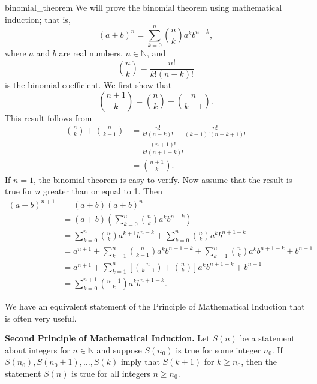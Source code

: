\begin{example}{binomial_theorem}
We will prove the binomial theorem using mathematical induction; that is, 
\[
(a + b)^n = \sum_{k = 0}^{n} \binom{n}{k} a^k b^{n - k},
\]
where $a$ and $b$ are real numbers, $n \in \mathbb{N}$, and
\[
\binom{n}{k}
= \frac{n!}{k! (n - k)!}\label{factorial}
\]
is the binomial coefficient.\label{binomial}  We first show that
\[
\binom{n + 1}{k}
=
\binom{n}{k} + \binom{n}{k - 1}.
\]
This result follows from
\begin{align*}
\binom{n}{k} + \binom{n}{k - 1}
& =
\frac{n!}{k!(n - k)!}
+\frac{n!}{(k-1)!(n - k + 1)!} \\
& =
\frac{(n + 1)!}{k!(n + 1 - k)!} \\
& =
\binom{n + 1}{k}.
\end{align*}
If $n = 1$, the binomial theorem is easy to verify. Now assume that the result is true for $n$ greater than or equal to 1.  Then
\begin{align*}
(a + b)^{n + 1}
& = 
(a + b)(a + b)^n \\
& =
(a + b) 
\left(
\sum_{k = 0}^{n} \binom{n}{k} a^k b^{n - k}
\right) \\
& = 
\sum_{k = 0}^{n} \binom{n}{k} a^{k + 1} b^{n - k}   +
\sum_{k = 0}^{n} \binom{n}{k} a^k b^{n + 1 - k} \\
& = 
a^{n + 1} + \sum_{k = 1}^{n} \binom{n}{k - 1} a^{k} b^{n + 1 - k} 
 +
\sum_{k = 1}^{n} \binom{n}{k}  a^k b^{n + 1 - k} + b^{n + 1}\\
&  = 
a^{n + 1} + \sum_{k = 1}^{n} \left[ \binom{n}{k - 1}
+
\binom{n}{k} \right]
a^k b^{n + 1 - k} + b^{n + 1} \\
&  = 
\sum_{k = 0}^{n + 1}   \binom{n + 1}{k} a^k b^{n + 1- k}.
\end{align*}
\end{example}
 
We have an equivalent statement of the Principle of Mathematical Induction that is often very useful.
 
\medskip

\noindent 
{\bf Second Principle of Mathematical Induction.}  
Let $S(n)$ be a statement about integers for  $n \in {\mathbb N}$ and suppose $S(n_0)$ is true for some integer $n_0$.  If $S(n_0), S(n_0 + 1), \ldots, S(k)$ imply that $S(k + 1)$ for $k \geq n_0$, then the statement $S(n)$ is true for all integers $n \geq n_0$.   

 
